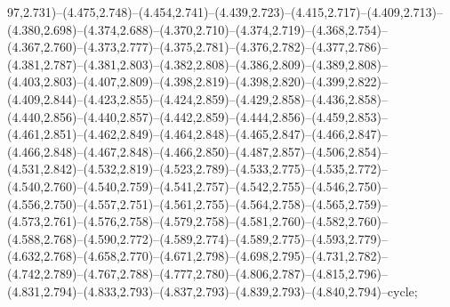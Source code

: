 97,2.731)--(4.475,2.748)--(4.454,2.741)--(4.439,2.723)--(4.415,2.717)--(4.409,2.713)--(4.380,2.698)--(4.374,2.688)--(4.370,2.710)--(4.374,2.719)--(4.368,2.754)--(4.367,2.760)--(4.373,2.777)--(4.375,2.781)--(4.376,2.782)--(4.377,2.786)--(4.381,2.787)--(4.381,2.803)--(4.382,2.808)--(4.386,2.809)--(4.389,2.808)--(4.403,2.803)--(4.407,2.809)--(4.398,2.819)--(4.398,2.820)--(4.399,2.822)--(4.409,2.844)--(4.423,2.855)--(4.424,2.859)--(4.429,2.858)--(4.436,2.858)--(4.440,2.856)--(4.440,2.857)--(4.442,2.859)--(4.444,2.856)--(4.459,2.853)--(4.461,2.851)--(4.462,2.849)--(4.464,2.848)--(4.465,2.847)--(4.466,2.847)--(4.466,2.848)--(4.467,2.848)--(4.466,2.850)--(4.487,2.857)--(4.506,2.854)--(4.531,2.842)--(4.532,2.819)--(4.523,2.789)--(4.533,2.775)--(4.535,2.772)--(4.540,2.760)--(4.540,2.759)--(4.541,2.757)--(4.542,2.755)--(4.546,2.750)--(4.556,2.750)--(4.557,2.751)--(4.561,2.755)--(4.564,2.758)--(4.565,2.759)--(4.573,2.761)--(4.576,2.758)--(4.579,2.758)--(4.581,2.760)--(4.582,2.760)--(4.588,2.768)--(4.590,2.772)--(4.589,2.774)--(4.589,2.775)--(4.593,2.779)--(4.632,2.768)--(4.658,2.770)--(4.671,2.798)--(4.698,2.795)--(4.731,2.782)--(4.742,2.789)--(4.767,2.788)--(4.777,2.780)--(4.806,2.787)--(4.815,2.796)--(4.831,2.794)--(4.833,2.793)--(4.837,2.793)--(4.839,2.793)--(4.840,2.794)--cycle;
